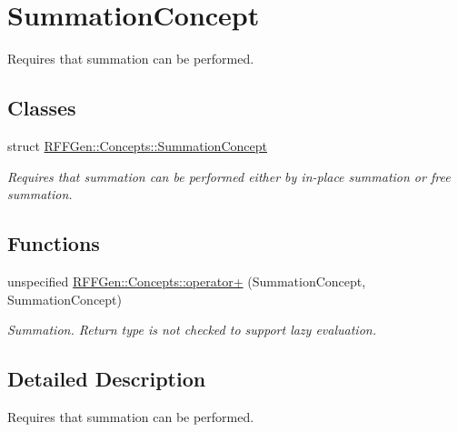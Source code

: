 \hypertarget{group__SummationConcept}{\section{Summation\-Concept}
\label{group__SummationConcept}
}


Requires that summation can be performed.  


\subsection*{Classes}
\begin{DoxyCompactItemize}
\item 
struct \hyperlink{structRFFGen_1_1Concepts_1_1SummationConcept}{R\-F\-F\-Gen\-::\-Concepts\-::\-Summation\-Concept}
\begin{DoxyCompactList}\small\item\em Requires that summation can be performed either by in-\/place summation or free summation. \end{DoxyCompactList}\end{DoxyCompactItemize}
\subsection*{Functions}
\begin{DoxyCompactItemize}
\item 
\hypertarget{group__SummationConcept_ga62ff2da5538973120310c4e4c88cc27c}{unspecified \hyperlink{group__SummationConcept_ga62ff2da5538973120310c4e4c88cc27c}{R\-F\-F\-Gen\-::\-Concepts\-::operator+} (Summation\-Concept, Summation\-Concept)}\label{group__SummationConcept_ga62ff2da5538973120310c4e4c88cc27c}

\begin{DoxyCompactList}\small\item\em Summation. Return type is not checked to support lazy evaluation. \end{DoxyCompactList}\end{DoxyCompactItemize}


\subsection{Detailed Description}
Requires that summation can be performed. 